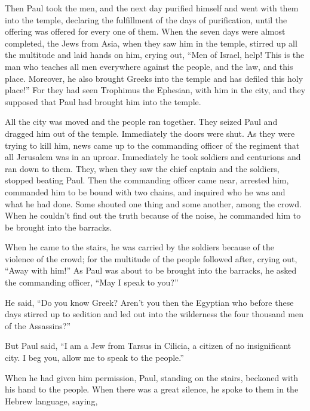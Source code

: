  Then Paul took the men, and the next day purified himself
and went with them into the temple, declaring the fulfillment of the
days of purification, until the offering was offered for every one of
them.  When the seven days were almost completed, the Jews
from Asia, when they saw him in the temple, stirred up all the multitude
and laid hands on him,  crying out, ``Men of Israel, help!
This is the man who teaches all men everywhere against the people, and
the law, and this place. Moreover, he also brought Greeks into the
temple and has defiled this holy place!''  For they had
seen Trophimus the Ephesian, with him in the city, and they supposed
that Paul had brought him into the temple.

 All the city was moved and the people ran together. They
seized Paul and dragged him out of the temple. Immediately the doors
were shut.  As they were trying to kill him, news came up
to the commanding officer of the regiment that all Jerusalem was in an
uproar.  Immediately he took soldiers and centurions and
ran down to them. They, when they saw the chief captain and the
soldiers, stopped beating Paul.  Then the commanding
officer came near, arrested him, commanded him to be bound with two
chains, and inquired who he was and what he had done.  Some
shouted one thing and some another, among the crowd. When he couldn't
find out the truth because of the noise, he commanded him to be brought
into the barracks.

 When he came to the stairs, he was carried by the soldiers
because of the violence of the crowd;  for the multitude of
the people followed after, crying out, ``Away with him!'' 
As Paul was about to be brought into the barracks, he asked the
commanding officer, ``May I speak to you?''

He said, ``Do you know Greek?  Aren't you then the Egyptian
who before these days stirred up to sedition and led out into the
wilderness the four thousand men of the Assassins?''

 But Paul said, ``I am a Jew from Tarsus in Cilicia, a
citizen of no insignificant city. I beg you, allow me to speak to the
people.''

 When he had given him permission, Paul, standing on the
stairs, beckoned with his hand to the people. When there was a great
silence, he spoke to them in the Hebrew language, saying,

